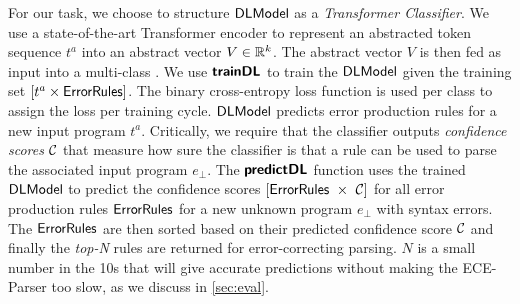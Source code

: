 

%

%
For our task, we choose to structure $\mathsf{DLModel}$ as a \emph{Transformer
Classifier}. We use a state-of-the-art Transformer encoder to represent an
abstracted token sequence $t^a$ into an abstract vector $V \in \mathbb{R}^k$. The
abstract vector $V$ is then fed as input into a multi-class \dnn. We use
$\bm{\mathsf{trainDL}}$ to train the $\mathsf{DLModel}$ given the training set $[t^a \times
\mathsf{ErrorRules}]$. The binary cross-entropy loss function is used per class to
assign the loss per training cycle. $\mathsf{DLModel}$ predicts error production rules for
a new input program $t^a$. Critically, we require that the classifier outputs
\emph{confidence scores} $\mathcal{C}$ that measure how sure the classifier is that a
rule can be used to parse the associated input program $e_{\bot}$. The
$\bm{\mathsf{predictDL}}$ function uses the trained $\mathsf{DLModel}$ to predict the confidence
scores $\List{\errorrulessym\ \times\ \Conf}$ for all error production rules
$\mathsf{ErrorRules}$ for a new unknown program $e_\bot$ with syntax errors. The
$\mathsf{ErrorRules}$ are then sorted based on their predicted confidence score
$\mathcal{C}$ and finally the \emph{top-N} rules are returned for error-correcting
parsing. $N$ is a small number in the 10s that will give accurate predictions
without making the ECE-Parser too slow, as we discuss in \autoref{sec:eval}.
